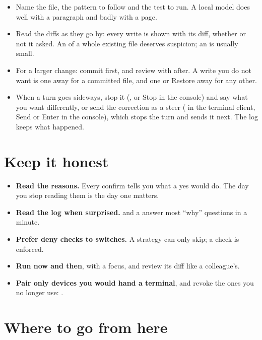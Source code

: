 \begin{itemize}
  \item Name the file, the pattern to follow and the test to run. A local
    model does well with a paragraph and badly with a page.
  \item Read the diffs as they go by: every write is shown with its diff,
    whether or not it asked. An  of a whole existing file
    deserves suspicion; an  is usually small.
  \item For a larger change: commit first, and review with 
    after. A write you do not want is one  away for a
    committed file, and one  or Restore away for any
    other.
  \item When a turn goes sideways, stop it (, or Stop in the
    console) and say what you want differently, or send the correction as
    a steer ( in the terminal client, Send or Enter in the console),
    which stops the turn and sends it next. The log keeps what
    happened.
\end{itemize}

\section{Keep it honest}

\begin{itemize}
  \item \textbf{Read the reasons.} Every confirm tells you what a yes would
    do. The day you stop reading them is the day one matters.
  \item \textbf{Read the log when surprised.}  and a
     answer most ``why'' questions in a minute.
  \item \textbf{Prefer deny checks to switches.} A strategy can only skip; a
    check is enforced.
  \item \textbf{Run  now and then}, with a focus, and review
    its diff like a colleague's.
  \item \textbf{Pair only devices you would hand a terminal}, and revoke
    the ones you no longer use: .
\end{itemize}

\section{Where to go from here}


